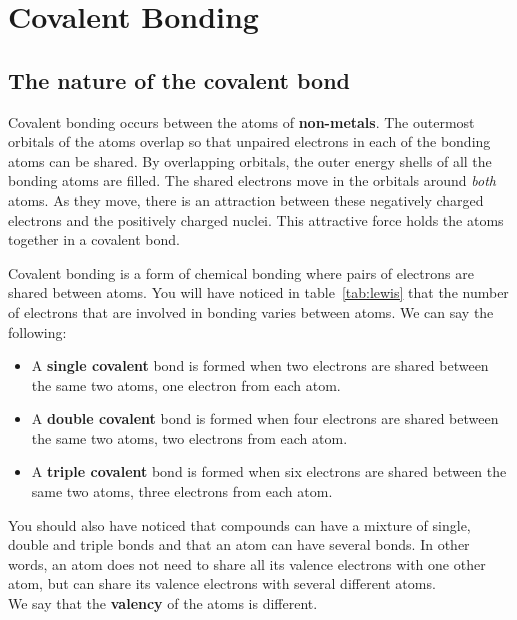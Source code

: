             \section{Covalent Bonding}
            \nopagebreak
            \label{m38704*uid6}
            \subsection*{The nature of the covalent bond}
            \nopagebreak
        \label{m38704*id138956}Covalent bonding occurs between the atoms of \textbf{non-metals}. The outermost orbitals of the atoms overlap so that unpaired electrons in each of the bonding atoms can be shared. By overlapping orbitals, the outer energy shells of all the bonding atoms are filled. The shared electrons move in the orbitals around \textsl{both} atoms. As they move, there is an attraction between these negatively charged electrons and the positively charged nuclei. This attractive force holds the atoms together in a covalent bond.\par 
{}
\label{m38704*fhsst!!!underscore!!!id94}
 { Covalent bonding is a form of chemical bonding where pairs of electrons are shared between atoms.} 
\label{m38704*id139505}You will have noticed in table~\ref{tab:lewis} that the number of electrons that are involved in bonding varies between atoms.
 We can say the following:
\begin{itemize}
 \item A \textbf{single covalent} bond is formed when two electrons are shared between the same two atoms, one electron from each atom. 
 \item A \textbf{double covalent} bond is formed when four electrons are shared between the same two atoms, two electrons from each atom.
 \item A \textbf{triple covalent} bond is formed when six electrons are shared between the same two atoms, three electrons from each atom.
\end{itemize}
You should also have noticed that compounds can have a mixture of single, double and triple bonds and that an atom can have several bonds. In other words, an atom does not need to share all its valence electrons with one other atom, but can share its valence electrons with several different atoms.\\
We say that the \textbf{valency} of the atoms is different. 


